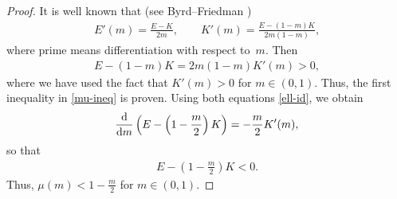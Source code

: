 \documentclass[pdftex]{sigma}
\numberwithin{equation}{section}
\begin{document}
\begin{proof}It is well known that (see Byrd--Friedman \cite[formulas~(710.00) and (710.02)]{BFbook})
\begin{align}\label{ell-id}
E'(m)=\frac{E-K}{2m},\qquad K'(m)=\frac{E-(1-m)K}{2m(1-m)},
\end{align}
where prime means differentiation with respect to~$m$. Then
\begin{align*}
E-(1-m)K=2m(1-m)K'(m)>0,
\end{align*}
where we have used the fact that $K'(m)>0$ for $m\in (0,1)$. Thus, the first inequality in \eqref{mu-ineq} is proven.
Using both equations \eqref{ell-id}, we obtain
\begin{align*}
\frac{{\rm d}}{{\rm d}m}\left(E-\left(1-\frac{m}{2}\right)K\right)=-\frac{m}{2}K'(m),
\end{align*}
so that
\begin{align*}
E-\left(1-\frac{m}{2}\right)K<0.
\end{align*}
Thus, $\mu(m)<1-\frac{m}{2}$ for $m\in (0,1)$.
\end{proof}
\end{document}
